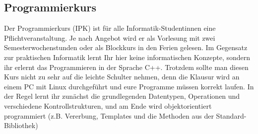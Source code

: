 \subsection{Programmierkurs}
\label{ipk}
Der Programmierkurs (\gls{IPK}) ist für alle Informatik-Studentinnen eine Pflichtveranstaltung. Je nach Angebot wird er als Vorlesung mit zwei Semesterwochenstunden oder als Blockkurs in den Ferien gelesen. Im Gegensatz zur praktischen Informatik lernt Ihr hier keine informatischen Konzepte, sondern ihr erlernt das Programmieren in der Sprache C++. Trotzdem sollte man diesen Kurs nicht zu sehr auf die leichte Schulter nehmen, denn die Klausur wird an einem PC mit Linux durchgeführt und eure Programme müssen korrekt laufen. In der Regel lernt ihr zunächst die grundlegenden Datentypen, Operationen und verschiedene Kontrollstrukturen, und am Ende wird objektorientiert programmiert (z.B. Vererbung, Templates und die Methoden aus der Standard-Bibliothek)
